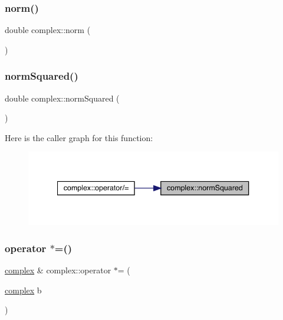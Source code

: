 \subsubsection{\texorpdfstring{norm()}{norm()}}
{\footnotesize\ttfamily double complex\+::norm (\begin{DoxyParamCaption}{ }\end{DoxyParamCaption})}

\mbox{\label{classcomplex_a5f69e50235222338ccd0e985de6b80d1}} 
\subsubsection{\texorpdfstring{normSquared()}{normSquared()}}
{\footnotesize\ttfamily double complex\+::norm\+Squared (\begin{DoxyParamCaption}{ }\end{DoxyParamCaption})}

Here is the caller graph for this function\+:
\nopagebreak
\begin{figure}[H]
\begin{center}
\leavevmode
\includegraphics[width=340pt]{classcomplex_a5f69e50235222338ccd0e985de6b80d1_icgraph}
\end{center}
\end{figure}
\mbox{\label{classcomplex_a1916e5817cf8faf91347120309e99e59}} 
\subsubsection{\texorpdfstring{operator $\ast$=()}{operator *=()}\hspace{0.1cm}{\footnotesize\ttfamily [1/2]}}
{\footnotesize\ttfamily \mbox{\hyperlink{classcomplex}{complex}} \& complex\+::operator $\ast$= (\begin{DoxyParamCaption}\item[{\mbox{\hyperlink{classcomplex}{complex}}}]{b }\end{DoxyParamCaption})}


